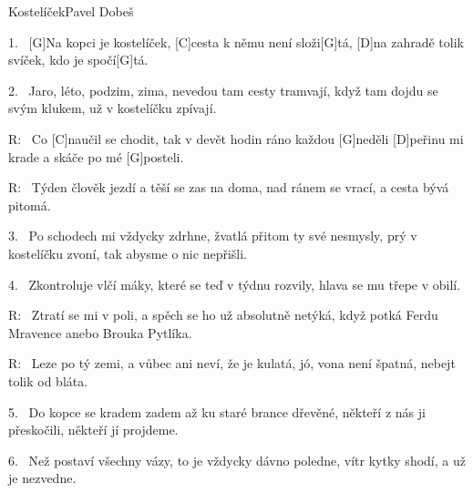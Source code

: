 \begin{song}{Kostelíček}{Pavel Dobeš}

\begin{xverse}{1.~}
[\large G]Na kopci je kostelíček, [\large C]cesta k němu není složi[\large G]tá,
[\large D]na zahradě tolik svíček, kdo je spočí[\large G]tá.
\end{xverse}

\begin{xverse}{2.~}
Jaro, léto, podzim, zima, nevedou tam cesty tramvají,
když tam dojdu se svým klukem, už v kostelíčku zpívají.
\end{xverse}

\begin{xverse}{R:~}
Co [\large C]naučil se chodit, tak v devět hodin ráno každou [\large G]neděli
[\large D]peřinu mi krade a skáče po mé [\large G]posteli.
\end{xverse}

\begin{xverse}{R:~}
Týden člověk jezdí a těší se zas na doma,
nad ránem se vrací, a cesta bývá pitomá.
\end{xverse}

\begin{xverse}{3.~}
Po schodech mi vždycky zdrhne, žvatlá přitom ty své nesmysly,
prý v kostelíčku zvoní, tak abysme o nic nepřišli.
\end{xverse}

\begin{xverse}{4.~}
Zkontroluje vlčí máky, které se teď v týdnu rozvily,
hlava se mu třepe v obilí.
\end{xverse}

\begin{xverse}{R:~}
Ztratí se mi v poli, a spěch se ho už absolutně netýká,
když potká Ferdu Mravence anebo Brouka Pytlíka.
\end{xverse}

\begin{xverse}{R:~}
Leze po tý zemi, a vůbec ani neví, že je kulatá,
jó, vona není špatná, nebejt tolik od bláta.
\end{xverse}

\begin{xverse}{5.~}
Do kopce se kradem zadem až ku staré brance dřevěné,
někteří z nás ji přeskočili, někteří jí projdeme.
\end{xverse}

\begin{xverse}{6.~}
Než postaví všechny vázy, to je vždycky dávno poledne,
vítr kytky shodí, a už je nezvedne.
\end{xverse}


\end{song}
